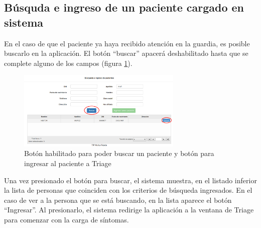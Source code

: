 \subsection{Búsquda e ingreso de un paciente cargado en sistema}
En el caso de que el paciente ya haya recibido atención en la guardia, es posible buscarlo en la aplicación. El botón ``buscar'' apacerá deshabilitado hasta que se complete alguno de los campos (figura \ref{fig:inicio_busqueda}).
\begin{figure}
\centerline{\includegraphics[width=0.7\textwidth]{inicio_busqueda.png}}
\caption{Botón habilitado para poder buscar un paciente y botón para ingresar al paciente a Triage} \label{fig:inicio_busqueda}
\end{figure}
Una vez presionado el botón para buscar, el sistema muestra, en el listado inferior la lista de personas que coinciden con los criterios de búsqueda ingresados. En el caso de ver a la persona que se está buscando, en la lista aparece el botón ``Ingresar''. Al presionarlo, el sistema redirige la aplicación a la ventana de Triage para comenzar con la carga de síntomas.